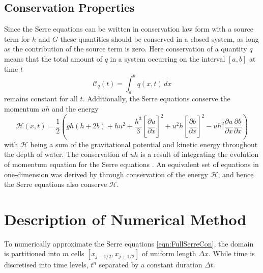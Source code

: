\documentclass[times]{elsarticle}
\begin{document}
\subsection{Conservation Properties}
Since the Serre equations can be written in conservation law form with a source term for $h$ and $G$ these quantities should be conserved in a closed system, as long as the contribution of the source term is zero. Here conservation of a quantity $q$ means that the total amount of $q$ in a system occurring on the interval $[a,b]$ at time $t$
\begin{equation*}
\mathcal{C}_q(t) = \int_{a}^{b} q(x,t)\, dx
\end{equation*}
remains constant for all $t$. Additionally, the Serre equations conserve the momentum $uh$ and the energy
\begin{equation*}
\mathcal{H}(x,t) = \frac{1}{2} \left( gh\left(h + 2b\right) + hu^2  + \frac{h^3}{3} \left[\frac{\partial u}{\partial x}\right]^2 + u^2h\left[\frac{\partial b}{\partial x}\right]^2 - uh^2 \frac{\partial u}{\partial x} \frac{\partial b}{\partial x}  \right)
\label{eqn:Hamildef}
\end{equation*}
with $\mathcal{H}$ being a sum of the gravitational potential and kinetic energy throughout the depth of water.
The conservation of $uh$ is a result of integrating the evolution of momentum equation for the Serre equations \cite{Zoppou-etal-2017}. An equivalent set of equations in one-dimension was derived by \citet{Green-Naghdi-1976-237} through conservation of the energy $\mathcal{H}$, and hence the Serre equations also conserve $\mathcal{H}$. 

\section{Description of Numerical Method}
To numerically approximate the Serre equations \eqref{eqn:FullSerreCon}, the domain is partitioned into $m$ cells $\left[x_{j-1/2},x_{j+1/2}\right]$ of uniform length $\Delta x$. While time is discretised into time levels, $t^n$ separated by a constant duration $\Delta t$.
\end{document}
